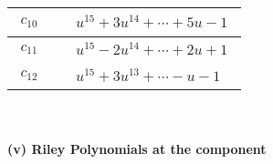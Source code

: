 \documentclass[1p]{elsarticle_modified}
\theoremstyle{definition}
\begin{document}
\begin{tabular}{m{50pt}|m{274pt}}
\hline $$\begin{aligned}c_{10}\end{aligned}$$&$\begin{aligned}
&u^{15}+3 u^{14}+\cdots+5 u-1
\end{aligned}$\\
\hline $$\begin{aligned}c_{11}\end{aligned}$$&$\begin{aligned}
&u^{15}-2 u^{14}+\cdots+2 u+1
\end{aligned}$\\
\hline $$\begin{aligned}c_{12}\end{aligned}$$&$\begin{aligned}
&u^{15}+3 u^{13}+\cdots- u-1
\end{aligned}$\\
\hline
\end{tabular}\\~\\
\newpage\renewcommand{\arraystretch}{1}
\flushleft \textbf{(v) Riley Polynomials at the component}\newline \\
\end{document}

